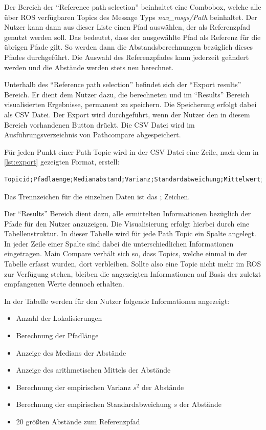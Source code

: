Der Bereich der ``Reference path selection'' beinhaltet eine Combobox, welche
alle über ROS verfügbaren Topics des Message Typs \textit{nav\_msgs/Path} beinhaltet.
Der Nutzer kann dann aus dieser Liste einen Pfad auswählen, der als
Referenzpfad genutzt werden soll. Das bedeutet, dass der ausgewählte Pfad als
Referenz für die übrigen Pfade gilt. So werden dann die Abstandsberechnungen
bezüglich dieses Pfades durchgeführt. Die Auswahl des Referenzpfades kann
jederzeit geändert werden und die Abstände werden stets neu berechnet.

Unterhalb des ``Reference path selection'' befindet sich der ``Export
results'' Bereich. Er dient dem Nutzer dazu, die berechneten und
im ``Results'' Bereich visualisierten Ergebnisse, permanent zu speichern.
Die Speicherung erfolgt dabei als \gls{CSV} Datei. Der Export wird
durchgeführt, wenn der Nutzer den in diesem Bereich vorhandenen Button drückt. 
Die CSV Datei wird im Ausführungsverzeichnis von Pathcompare abgespeichert.

Für jeden Punkt einer Path Topic wird in der CSV Datei eine Zeile, nach dem in
\autoref{lst:export} gezeigten Format, erstell:

\begin{lstlisting}[caption=Format der Export CSV Datei, label=lst:export]
Topicid;Pfadlaenge;Medianabstand;Varianz;Standardabweichung;Mittelwert;Zeitstempel;x;y;z;Abstand
\end{lstlisting}

Das Trennzeichen für die einzelnen Daten ist das ; Zeichen.


Der ``Results'' Bereich dient dazu, alle ermittelten Informationen bezüglich der
Pfade für den Nutzer anzuzeigen. Die Visualisierung erfolgt hierbei durch eine
Tabellenstruktur. In dieser Tabelle wird für jede Path Topic ein Spalte
angelegt.
In jeder Zeile einer Spalte sind dabei die unterschiedlichen
Informationen eingetragen.
Main Compare verhält sich so, dass Topics, welche einmal in
der Tabelle erfasst wurden, dort verbleiben. Sollte also eine Topic nicht
mehr im ROS zur Verfügung stehen, bleiben die angezeigten Informationen auf
Basis der zuletzt empfangenen Werte dennoch erhalten. 

In der Tabelle werden für den Nutzer folgende Informationen angezeigt:

\begin{itemize}
  \item Anzahl der Lokalisierungen
  \item Berechnung der Pfadlänge
  \item Anzeige des Medians der Abstände
  \item Anzeige des arithmetischen Mittels der Abstände
  \item Berechnung der empirischen Varianz $s^2$ der Abstände
  \item Berechnung der empirischen Standardabweichung $s$ der Abstände
  \item 20 größten Abstände zum Referenzpfad
\end{itemize}

